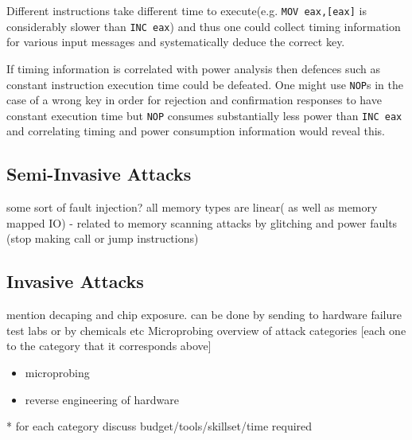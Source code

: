 \documentclass[10pt,journal,compsoc]{IEEEtran}
\begin{document}
	Different instructions take different time to execute(e.g. \texttt{MOV eax,[eax]} is considerably slower than \texttt{INC eax}) and thus one could collect timing information for various input messages and systematically deduce the correct key. 
	
	If timing information is correlated with power analysis then defences such as constant instruction execution time could be defeated. One might use \texttt{NOP}s in the case of a wrong key in order for rejection and confirmation responses to have constant execution time but \texttt{NOP} consumes substantially less power than \texttt{INC eax} and correlating timing and power consumption information would reveal this.

	\subsection{Semi-Invasive Attacks}
	some sort of fault injection?
		all memory types are linear( as well as memory mapped IO) - related to memory scanning attacks by glitching and power faults (stop making call or jump instructions)
	\subsection{Invasive Attacks}
	mention decaping and chip exposure. can be done by sending to hardware failure test labs\citep{website:hacking_the_pic} or by chemicals etc \citep{anderson:cautionary_note}
	Microprobing
	overview of attack categories [each one to the category that it corresponds above]
	\begin{itemize}
		\item microprobing \\
		\item reverse engineering of hardware\\
	\end{itemize}
	
	* for each category discuss budget/tools/skillset/time required\\




	
	
		
	
\end{document}
